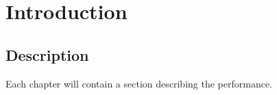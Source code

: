 \section{Introduction}

\subsection{Description}
Each chapter will contain a section describing the performance.
